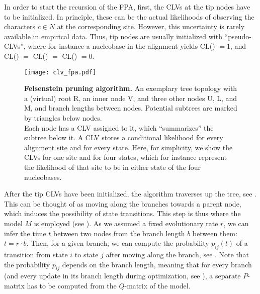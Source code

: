 In order to start the recursion of the FPA, first, the CLVs at the tip nodes have to be initialized.
In principle, these can be the actual likelihoods of observing the characters $c \in N$ at the corresponding site.
However, this uncertainty is rarely available in empirical data.
Thus, tip nodes are usually initialized with ``pseudo-CLVs'',
where for instance a nucleobase  in the alignment yields
CL() $= 1$, and CL() $=$ CL() $=$ CL() $= 0$.

\begin{figure}[pthb]
    \centering
    \texttt{[image: clv\_fpa.pdf]}
    \caption[Felsenstein pruning algorithm]{
        \textbf{Felsenstein pruning algorithm.}
        An exemplary tree topology with a (virtual) root {\sffamily R}, an inner node {\sffamily V},
        and three other nodes {\sffamily U}, {\sffamily L}, and {\sffamily M},
        and branch lengths between nodes.
        Potential subtrees are marked by triangles below nodes.
        \\
        Each node has a CLV assigned to it, which ``summarizes'' the subtree below it.
        A CLV stores a conditional likelihood for every alignment site and for every state.
        Here, for simplicity, we show the CLVs for one site and for four states,
        which for instance represent the likelihood of that site to be in either state of the four nucleobases.
    }
    \label{fig:clv_fpa}
\end{figure}

After the tip CLVs have been initialized, the algorithm traverses up the tree, see .
This can be thought of as moving along the branches towards a parent node,
which induces the possibility of state transitions.
This step is thus where the model $M$ is employed (see ).
As we assumed a fixed evolutionary rate $r$,
we can infer the time $t$ between two nodes from the branch length $b$ between them: $t = r \cdot b$.
Then, for a given branch, we can compute the probability $p_{ij}(t)$ of a transition
from state $i$ to state $j$ after moving along the branch, see .
Note that the probability $p_{ij}$ depends on the branch length,
meaning that for every branch (and every update in its branch length during optimization,
see ),
a separate $P$-matrix has to be computed from the $Q$-matrix of the model.

